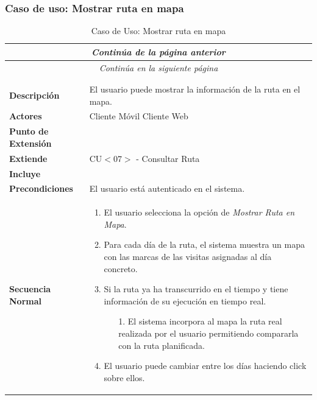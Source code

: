 \subsubsection*{Caso de uso: Mostrar ruta en mapa}
\begin{longtable}{| p{4cm} | p{10cm} |}
\endfirsthead
\multicolumn{2}{c}{\textit{Continúa de la página anterior}}\\[12pt]
\hline
\endhead
\hline
\multicolumn{2}{c}{\textit{Continúa en la siguiente página}} \\
\endfoot
\hline
\caption{Caso de Uso: Mostrar ruta en mapa}\label{fig:1}\\
\endlastfoot


\hline
\multicolumn{2}{|c|}{\textbf{CU$<$10$>$ - Mostrar Ruta en Mapa}} \\

\hline
\textbf{Descripción} &
El usuario puede mostrar la información de la ruta en el mapa.\\

\hline
\textbf{Actores} &
Cliente Móvil\newline
Cliente Web\\

\hline
\textbf{Punto de Extensión} &
\\

\hline
\textbf{Extiende} &
CU$<$07$>$ - Consultar Ruta
\\

\hline
\textbf{Incluye} &
\\

\hline
\textbf{Precondiciones} &
El usuario está autenticado en el sistema.\\

\hline
\textbf{Secuencia Normal} &\mbox{}\par\vspace{-\baselineskip}
\begin{enumerate}[leftmargin=0.7cm, topsep=0.1cm]
\item El usuario selecciona la opción de \textit{Mostrar Ruta en Mapa}.
\item Para cada día de la ruta, el sistema muestra un mapa con las marcas de las visitas asignadas al día concreto.
\item Si la ruta ya ha transcurrido en el tiempo y tiene información de su ejecución en tiempo real.
	\begin{itemize}
	\item[1.] El sistema incorpora al mapa la ruta real realizada por el usuario permitiendo compararla con la ruta planificada.
	\end{itemize}
\item El usuario puede cambiar entre los días haciendo click sobre ellos.
\end{enumerate}\\


\end{longtable}
